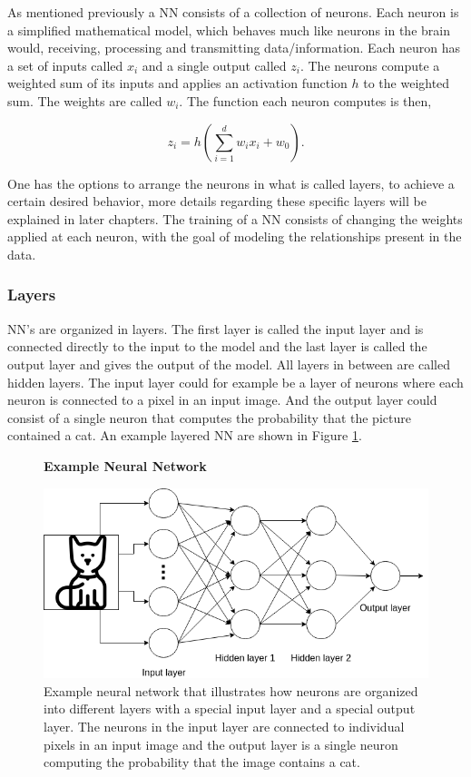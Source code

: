 As mentioned previously a \gls{NN} consists of a collection of neurons. Each
neuron is a simplified mathematical model, which behaves much like neurons in
the brain would, receiving, processing and transmitting data/information. Each
neuron has a set of inputs called $x_i$ and a single output called $z_i$. The
neurons compute a weighted sum of its inputs and applies an activation function
$h$ to the weighted sum. The weights are called $w_i$. The function each neuron
computes is then,

\begin{equation}\label{eq:neuron}
    z_i = h\left(
        \sum_{i = 1}^d w_ix_i + w_0
    \right).
\end{equation}

One has the options to arrange the neurons in what is called layers, to achieve
a certain desired behavior, more details regarding these specific layers will
be explained in later chapters.
The training of a \gls{NN} consists of changing the weights applied at each
neuron, with the goal of modeling the relationships present in the data.

\subsubsection{Layers} \label{subsubsec:layers}

\gls{NN}'s are organized in layers. The first layer is called the input layer
and is connected directly to the input to the model and the last layer is called
the output layer and gives the output of the model. All layers in between are
called hidden layers. The input layer could for example be a layer of neurons
where each neuron is connected to a pixel in an input image. And the output
layer could consist of a single neuron that computes the probability that the
picture contained a cat. An example layered \gls{NN} are shown in Figure
\ref{fig:example_nn}.

\begin{figure}
    \centering
    \textbf{Example Neural Network}\par\medskip
    \includegraphics[width=\textwidth]{./pictures/method/example_neural_network.png}
    \caption{Example neural network that illustrates how neurons are organized
        into different layers with a special input layer and a special output
        layer. The neurons in the input layer are connected to individual pixels
        in an input image and the output layer is a single neuron computing the
        probability that the image contains a cat.}
    \label{fig:example_nn}
\end{figure}

